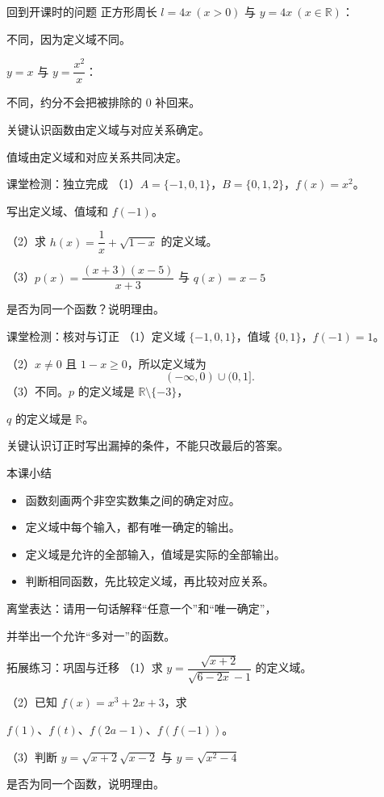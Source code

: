 \documentclass[aspectratio=169,10pt]{beamer}
\newcommand{\R}{\mathbb R}
\newcommand{\src}[1]{}
\newcommand{\key}[1]{\begin{block}{关键认识}#1\end{block}}
\begin{document}
\begin{frame}[t]{回到开课时的问题}
正方形周长 $l=4x\ (x>0)$ 与 $y=4x\ (x\in\R)$：\par
\alert{不同}，因为定义域不同。\par\bigskip
$y=x$ 与 $y=\dfrac{x^2}{x}$：\par
\alert{不同}，约分不会把被排除的 $0$ 补回来。
\key{函数由定义域与对应关系确定。\par
值域由定义域和对应关系共同决定。}
\end{frame}
\begin{frame}[t]{课堂检测：独立完成}
（1）$A=\{-1,0,1\}$，$B=\{0,1,2\}$，$f(x)=x^2$。\par
写出定义域、值域和 $f(-1)$。\par\medskip
（2）求 $h(x)=\dfrac1x+\sqrt{1-x}$ 的定义域。\par\medskip
（3）$p(x)=\dfrac{(x+3)(x-5)}{x+3}$ 与 $q(x)=x-5$\par
是否为同一个函数？说明理由。
\src{（1）自编；（2）（3）选自《三维设计》第32页对点练清。}
\end{frame}
\begin{frame}[t]{课堂检测：核对与订正}
（1）定义域 $\{-1,0,1\}$，值域 $\{0,1\}$，$f(-1)=1$。\par\bigskip
（2）$x\ne0$ 且 $1-x\ge0$，所以定义域为
\[\boxed{(-\infty,0)\cup(0,1].}\]
（3）不同。$p$ 的定义域是 $\R\setminus\{-3\}$，\par
$q$ 的定义域是 $\R$。
\key{订正时写出漏掉的条件，不能只改最后的答案。}
\end{frame}
\begin{frame}[t]{本课小结}
\begin{itemize}
\item 函数刻画两个非空实数集之间的确定对应。
\item 定义域中每个输入，都有唯一确定的输出。
\item 定义域是允许的全部输入，值域是实际的全部输出。
\item 判断相同函数，先比较定义域，再比较对应关系。
\end{itemize}
\bigskip
离堂表达：请用一句话解释“任意一个”和“唯一确定”，\par
并举出一个允许“多对一”的函数。
\end{frame}
\begin{frame}[t]{拓展练习：巩固与迁移}
（1）求 $y=\dfrac{\sqrt{x+2}}{\sqrt{6-2x}-1}$ 的定义域。\par\medskip
（2）已知 $f(x)=x^3+2x+3$，求\par
\quad $f(1)$、$f(t)$、$f(2a-1)$、$f(f(-1))$。\par\medskip
（3）判断 $y=\sqrt{x+2}\sqrt{x-2}$ 与 $y=\sqrt{x^2-4}$\par
是否为同一个函数，说明理由。
\src{《三维设计》第32页对点练清第2、3题及典例4选项A。可作课后练习。}
\end{frame}
\end{document}
